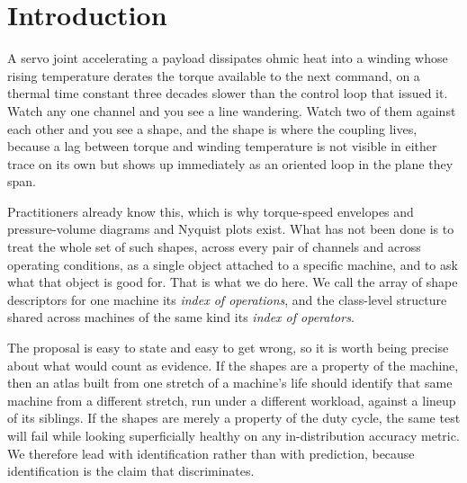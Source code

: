 \documentclass[11pt]{article}
\begin{document}
\begin{abstract}
We are equally specific about what the construction does not buy. Against a
strong non-relational baseline, per channel means, standard deviations, skews
and kurtoses, the in-distribution gain is modest, 32.5\% against 25.0\%. The
separation appears only when instrumentation changes, where the atlas is
unmoved at 32.5\% and the baseline falls to 5.0\%. Atoms also need roughly
$10^3$ to $10^4$ samples per unit before they stop being noise, which is why
the same method returns almost nothing on C-MAPSS, whose units are 200 cycles
long. And the invariance that makes the atlas survive re-instrumentation is
what makes it blind to absolute level, so a machine that simply runs hotter is
invisible to it. Invariance and identifiability trade off, and we quantify the
trade rather than resolve it.
\end{abstract}

\section{Introduction}

A servo joint accelerating a payload dissipates ohmic heat into a winding whose
rising temperature derates the torque available to the next command, on a
thermal time constant three decades slower than the control loop that issued
it. Watch any one channel and you see a line wandering. Watch two of them
against each other and you see a shape, and the shape is where the coupling
lives, because a lag between torque and winding temperature is not visible in
either trace on its own but shows up immediately as an oriented loop in the
plane they span.

Practitioners already know this, which is why torque-speed envelopes and
pressure-volume diagrams and Nyquist plots exist. What has not been done is to
treat the whole set of such shapes, across every pair of channels and across
operating conditions, as a single object attached to a specific machine, and to
ask what that object is good for. That is what we do here. We call the array of
shape descriptors for one machine its \emph{index of operations}, and the
class-level structure shared across machines of the same kind its \emph{index
of operators}.

The proposal is easy to state and easy to get wrong, so it is worth being
precise about what would count as evidence. If the shapes are a property of the
machine, then an atlas built from one stretch of a machine's life should
identify that same machine from a different stretch, run under a different
workload, against a lineup of its siblings. If the shapes are merely a property
of the duty cycle, the same test will fail while looking superficially healthy
on any in-distribution accuracy metric. We therefore lead with identification
rather than with prediction, because identification is the claim that
discriminates.
\end{document}
